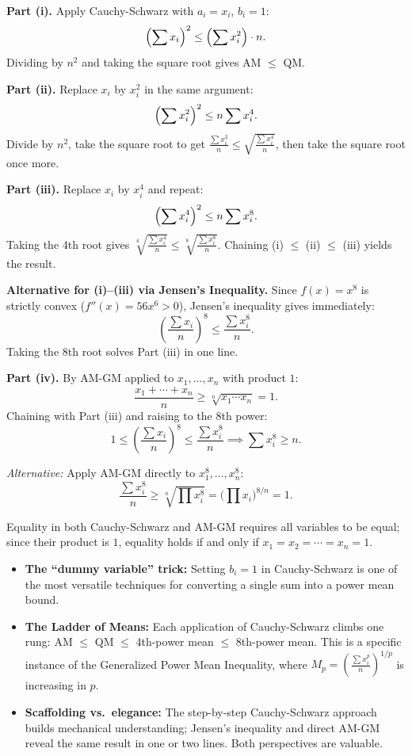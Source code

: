 \begin{solution}[Sketch]
\textbf{Part (i).} Apply Cauchy-Schwarz with $a_i = x_i$, $b_i = 1$:
\[
    \Bigl(\sum x_i\Bigr)^2 \le \Bigl(\sum x_i^2\Bigr)\cdot n.
\]
Dividing by $n^2$ and taking the square root gives AM $\le$ QM.

\textbf{Part (ii).} Replace $x_i$ by $x_i^2$ in the same argument:
\[
    \Bigl(\sum x_i^2\Bigr)^2 \le n\sum x_i^4.
\]
Divide by $n^2$, take the square root to get $\frac{\sum x_i^2}{n} \le \sqrt{\frac{\sum x_i^4}{n}}$, then take the square root once more.

\textbf{Part (iii).} Replace $x_i$ by $x_i^4$ and repeat:
\[
    \Bigl(\sum x_i^4\Bigr)^2 \le n\sum x_i^8.
\]
Taking the 4th root gives $\sqrt[4]{\frac{\sum x_i^4}{n}} \le \sqrt[8]{\frac{\sum x_i^8}{n}}$. Chaining (i) $\le$ (ii) $\le$ (iii) yields the result.

\textbf{Alternative for (i)--(iii) via Jensen's Inequality.} Since $f(x) = x^8$ is strictly convex ($f''(x) = 56x^6 > 0$), Jensen's inequality gives immediately:
\[
    \left(\frac{\sum x_i}{n}\right)^8 \le \frac{\sum x_i^8}{n}.
\]
Taking the 8th root solves Part (iii) in one line.

\textbf{Part (iv).} By AM-GM applied to $x_1, \dots, x_n$ with product $1$:
\[
    \frac{x_1 + \cdots + x_n}{n} \ge \sqrt[n]{x_1 \cdots x_n} = 1.
\]
Chaining with Part (iii) and raising to the 8th power:
\[
    1 \le \left(\frac{\sum x_i}{n}\right)^8 \le \frac{\sum x_i^8}{n} \implies \sum x_i^8 \ge n.
\]

\textit{Alternative:} Apply AM-GM directly to $x_1^8, \dots, x_n^8$:
\[
    \frac{\sum x_i^8}{n} \ge \sqrt[n]{\prod x_i^8} = \bigl(\prod x_i\bigr)^{8/n} = 1.
\]

Equality in both Cauchy-Schwarz and AM-GM requires all variables to be equal; since their product is $1$, equality holds if and only if $x_1 = x_2 = \cdots = x_n = 1$.
\end{solution}

\begin{takeaways}
\begin{itemize}[leftmargin=*]
    \item \textbf{The ``dummy variable'' trick:} Setting $b_i = 1$ in Cauchy-Schwarz is one of the most versatile techniques for converting a single sum into a power mean bound.
    \item \textbf{The Ladder of Means:} Each application of Cauchy-Schwarz climbs one rung: AM $\le$ QM $\le$ 4th-power mean $\le$ 8th-power mean. This is a specific instance of the Generalized Power Mean Inequality, where $M_p = \left(\frac{\sum x_i^p}{n}\right)^{1/p}$ is increasing in $p$.
    \item \textbf{Scaffolding vs.\ elegance:} The step-by-step Cauchy-Schwarz approach builds mechanical understanding; Jensen's inequality and direct AM-GM reveal the same result in one or two lines. Both perspectives are valuable.
\end{itemize}
\end{takeaways}

